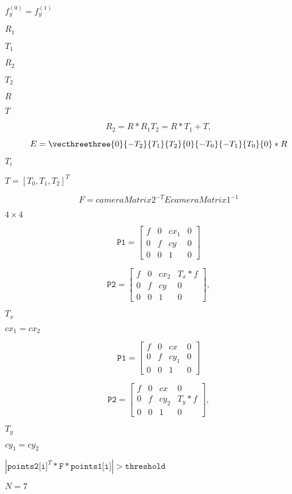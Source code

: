 \documentclass{article}
\begin{document}
$f^{(0)}_y=f^{(1)}_y$
\pagebreak

$R_1$
\pagebreak

$T_1$
\pagebreak

$R_2$
\pagebreak

$T_2$
\pagebreak

$R$
\pagebreak

$T$
\pagebreak

\[R_2=R*R_1
T_2=R*T_1 + T,\]
\pagebreak

\[E= \vecthreethree{0}{-T_2}{T_1}{T_2}{0}{-T_0}{-T_1}{T_0}{0} *R\]
\pagebreak

$T_i$
\pagebreak

$T=[T_0, T_1, T_2]^T$
\pagebreak

\[F = cameraMatrix2^{-T} E cameraMatrix1^{-1}\]
\pagebreak

$4 \times 4$
\pagebreak

\[\texttt{P1} = \begin{bmatrix} f & 0 & cx_1 & 0 \\ 0 & f & cy & 0 \\ 0 & 0 & 1 & 0 \end{bmatrix}\]
\pagebreak

\[\texttt{P2} = \begin{bmatrix} f & 0 & cx_2 & T_x*f \\ 0 & f & cy & 0 \\ 0 & 0 & 1 & 0 \end{bmatrix} ,\]
\pagebreak

$T_x$
\pagebreak

$cx_1=cx_2$
\pagebreak

\[\texttt{P1} = \begin{bmatrix} f & 0 & cx & 0 \\ 0 & f & cy_1 & 0 \\ 0 & 0 & 1 & 0 \end{bmatrix}\]
\pagebreak

\[\texttt{P2} = \begin{bmatrix} f & 0 & cx & 0 \\ 0 & f & cy_2 & T_y*f \\ 0 & 0 & 1 & 0 \end{bmatrix} ,\]
\pagebreak

$T_y$
\pagebreak

$cy_1=cy_2$
\pagebreak

$|\texttt{points2[i]}^T*\texttt{F}*\texttt{points1[i]}|>\texttt{threshold}$
\pagebreak

$N = 7$
\pagebreak
\end{document}
